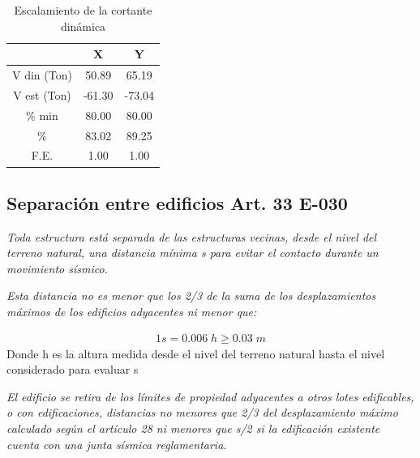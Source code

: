 \documentclass{article}%
\begin{document}
\begin{table}[h!]%
\centering%
\caption{Escalamiento de la cortante dinámica}%
\begin{tabular}{ccc}
\toprule
 & X & Y \\
\midrule
V din (Ton) & 50.89 & 65.19 \\
V est (Ton) & -61.30 & -73.04 \\
\% min & 80.00 & 80.00 \\
\% & 83.02 & 89.25 \\
F.E. & 1.00 & 1.00 \\
\bottomrule
\end{tabular}
%
\end{table}

%
\subsection{Separación entre edificios Art. 33 E{-}030}%
\label{subsec:SeparacinentreedificiosArt.33E{-}030}%
\begin{tcolorbox}[colback=gray!5!white,colframe=cyan!75!black,fonttitle=\bfseries,title=Art. 33.1]%
\textit{Toda estructura está separada de las estructuras vecinas, desde el nivel del terreno natural, una distancia mínima s para evitar el contacto durante un movimiento sísmico.}%
\end{tcolorbox}%
\begin{tcolorbox}[colback=gray!5!white,colframe=cyan!75!black,fonttitle=\bfseries,title=Art. 33.2]%
\textit{Esta distancia no es menor que los 2/3 de la suma de los desplazamientos máximos de los edificios adyacentes ni menor que:}%
\end{tcolorbox}%
\begin{alignat}{1}%
s=0.006\;h\geq0.03\;m%
\end{alignat}%
Donde h es la altura medida desde el nivel del terreno natural hasta el nivel considerado para evaluar s%
\begin{tcolorbox}[colback=gray!5!white,colframe=cyan!75!black,fonttitle=\bfseries,title=Art. 33.3]%
\textit{El edificio se retira de los límites de propiedad adyacentes a otros lotes edificables,  o  con  edificaciones,  distancias  no  menores  que  2/3  del desplazamiento máximo calculado según el artículo 28 ni menores que s/2 si la edificación existente cuenta con una junta sísmica reglamentaria.}%
\end{tcolorbox}%
\end{document}
